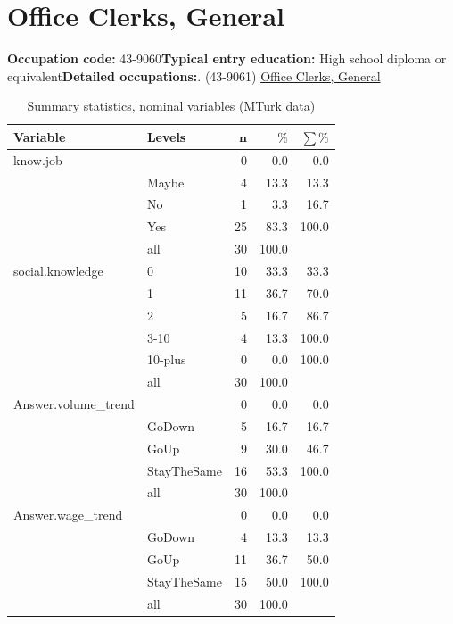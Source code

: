 \documentclass[a4paper,10pt]{article}\usepackage[]{graphicx}\usepackage[]{color}
\begin{document}
\newpage\section{Office Clerks, General}\textbf{Occupation code:} 43-9060\newline\textbf{Typical entry education:} High school diploma or equivalent\newline\textbf{Detailed occupations:}. (43-9061)  \href{http://www.bls.gov/oes/current/oes439061.htm}{Office Clerks, General}\newline%
\begin{table}[ht]
\centering
{\footnotesize
\begin{tabular}{ll|rrr}
 \textbf{Variable} & \textbf{Levels} & $\mathbf{n}$ & $\mathbf{\%}$ & $\mathbf{\sum \%}$ \\ 
  \hline
know.job &  & 0 & 0.0 & 0.0 \\ 
   & Maybe & 4 & 13.3 & 13.3 \\ 
   & No & 1 & 3.3 & 16.7 \\ 
   & Yes & 25 & 83.3 & 100.0 \\ 
   \hline
 & all & 30 & 100.0 &  \\ 
   \hline
\hline
social.knowledge & 0 & 10 & 33.3 & 33.3 \\ 
   & 1 & 11 & 36.7 & 70.0 \\ 
   & 2 & 5 & 16.7 & 86.7 \\ 
   & 3-10 & 4 & 13.3 & 100.0 \\ 
   & 10-plus & 0 & 0.0 & 100.0 \\ 
   \hline
 & all & 30 & 100.0 &  \\ 
   \hline
\hline
Answer.volume\_trend &  & 0 & 0.0 & 0.0 \\ 
   & GoDown & 5 & 16.7 & 16.7 \\ 
   & GoUp & 9 & 30.0 & 46.7 \\ 
   & StayTheSame & 16 & 53.3 & 100.0 \\ 
   \hline
 & all & 30 & 100.0 &  \\ 
   \hline
\hline
Answer.wage\_trend &  & 0 & 0.0 & 0.0 \\ 
   & GoDown & 4 & 13.3 & 13.3 \\ 
   & GoUp & 11 & 36.7 & 50.0 \\ 
   & StayTheSame & 15 & 50.0 & 100.0 \\ 
   \hline
 & all & 30 & 100.0 &  \\ 
   \hline
\hline
\end{tabular}
}
\caption{Summary statistics, nominal variables (MTurk data)} 
\label{tab1:43-9060}
\end{table}
\end{document}
